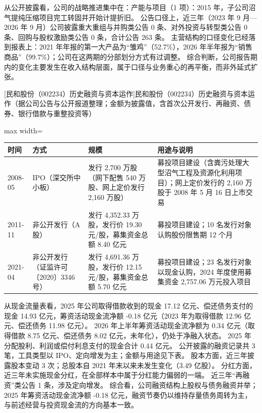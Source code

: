  从公开披露看，公司的战略推进集中在：产能与项目（1 项）：2015 年，子公司沼气提纯压缩项目完工转固并开始计提折旧。 公告口径上，近三年（2023 年 9 月---2026 年 9 月）公司披露重大重组与并购类公告 0 条、对外投资与转型类公告 0 条、回购与股权激励类公告 0 条，合计公告 263 条。 主营结构的口径变化已经落到报表上：2021 年年报的第一大产品为“雏鸡”（52.7\%），2026 年半年报为“销售商品”（99.7\%）；公司在这两期的分部划分方式有过调整。 综合判断，公司报告期内的变化主要发生在收入结构层面，属于口径与业务重心的再平衡，而非外延式扩张。

\begin{center}\small\setlength{\tabcolsep}{4pt}
[民和股份（002234）历史融资与资本运作]{民和股份（002234）历史融资与资本运作（据公司公告与公开报道整理；金额为披露值，含首次公开发行、再融资、债券、银行借款与重整投资等）}
\begin{adjustbox}{max width=\textwidth}
\begin{tabular}{@{}p{1.45cm}p{2.55cm}p{4.05cm}p{4.95cm}@{}}
\toprule
时间 & 方式 & 规模 & 用途与说明 \\
\midrule
2008-05 & IPO（深交所中小板） & 发行 2,\allowbreak{}700 万股（网下配售 540 万股、\allowbreak{}网上定价发行 2,\allowbreak{}160 万股） & 募投项目建设（含粪污处理大型沼气工程及资源化利用项目）；网上定价发行的 2,\allowbreak{}160 万股于 2008 年 5 月 16 日上市交易 \\
2011-11 & 非公开发行（A股） & 发行 4,\allowbreak{}352.33 万股，\allowbreak{}发行价 19.30 元/\allowbreak{}股，\allowbreak{}募集资金总额 8.40 亿元 & 募投项目建设；10 名发行对象认购股份限售期 12 个月 \\
2021-04 & 非公开发行（证监许可〔2020〕3346号） & 发行 4,\allowbreak{}691.36 万股，\allowbreak{}发行价 12.15 元/\allowbreak{}股，\allowbreak{}募集资金总额 5.70 亿元 & 募投项目建设；23 名发行对象以现金认购，\allowbreak{}2024 年度使用募集资金 2,\allowbreak{}757.06 万元投入项目 \\
\bottomrule
\end{tabular}
\end{adjustbox}
\end{center}

 从现金流量表看，2025 年公司取得借款收到的现金 17.12 亿元、偿还债务支付的现金 14.93 亿元，筹资活动现金流净额 -0.18 亿元（2023 年为取得借款 12.96 亿元、偿还债务 11.98 亿元）。 2026 年上半年筹资活动现金流净额为 0.34 亿元（取得借款 8.75 亿元、偿还债务 8.02 亿元，未年化），仍处于净融入状态。 2025 年分配股利、利润或偿付利息支付的现金合计 0.44 亿元。 公开披露的融资记录共 3 笔，工具类型以 IPO、定向增发为主；金额与用途见下表。 股本方面，近三年披露股本变动 3 次；总股本自 2021 年末以来未发生变化（3.49 亿股）。 分红方面，近三年未实施现金分红，在全部样本中属于分红能力偏弱的一端。 近三年“再融资”类公告 1 条，涉及定向增发。 综合看，公司融资结构上股权与债务融资并举；2025 年筹资活动现金流净额 -0.18 亿元，融资节奏仍以维持存量债务周转为主，与前述经营与投资现金流的方向基本一致。

